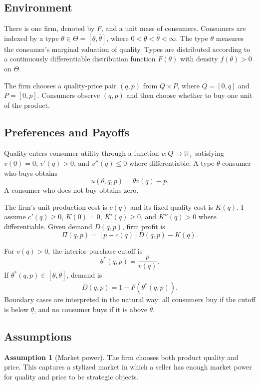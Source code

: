 \documentclass[12pt]{article}
\theoremstyle{plain}
\theoremstyle{definition}
\newtheorem{assumption}{Assumption}
\theoremstyle{remark}
\begin{document}
\subsection{Environment}

There is one firm, denoted by $F$, and a unit mass of consumers. Consumers are indexed by a type $\theta\in\Theta=[\underline\theta,\overline\theta]$, where $0<\underline\theta<\overline\theta<\infty$. The type $\theta$ measures the consumer's marginal valuation of quality. Types are distributed according to a continuously differentiable distribution function $F(\theta)$ with density $f(\theta)>0$ on $\Theta$.

The firm chooses a quality-price pair $(q,p)$ from $Q\times P$, where $Q=[0,\overline q]$ and $P=[0,\overline p]$. Consumers observe $(q,p)$ and then choose whether to buy one unit of the product.

\subsection{Preferences and Payoffs}

Quality enters consumer utility through a function $v:Q\to\mathbb R_+$ satisfying $v(0)=0$, $v'(q)>0$, and $v''(q)\leq 0$ where differentiable. A type-$\theta$ consumer who buys obtains
\[
 u(\theta,q,p)=\theta v(q)-p.
\]
A consumer who does not buy obtains zero.

The firm's unit production cost is $c(q)$ and its fixed quality cost is $K(q)$. I assume $c'(q)\geq 0$, $K(0)=0$, $K'(q)\geq 0$, and $K''(q)>0$ where differentiable. Given demand $D(q,p)$, firm profit is
\[
 \Pi(q,p)=[p-c(q)]D(q,p)-K(q).
\]

For $v(q)>0$, the interior purchase cutoff is
\[
 \theta^*(q,p)=\frac{p}{v(q)}.
\]
If $\theta^*(q,p)\in[\underline\theta,\overline\theta]$, demand is
\[
 D(q,p)=1-F(\theta^*(q,p)).
\]
Boundary cases are interpreted in the natural way: all consumers buy if the cutoff is below $\underline\theta$, and no consumer buys if it is above $\overline\theta$.

\subsection{Assumptions}

\begin{assumption}[Market power]
The firm chooses both product quality and price. This captures a stylized market in which a seller has enough market power for quality and price to be strategic objects.
\end{assumption}
\end{document}
